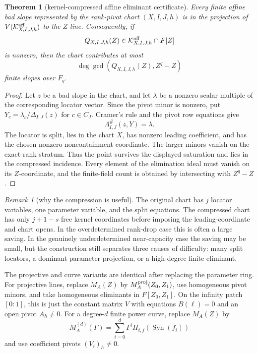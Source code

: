 \documentclass[11pt]{article}
\newtheorem{theorem}{Theorem}[section]
\theoremstyle{definition}
\theoremstyle{remark}
\newtheorem{remark}[remark]{Remark}
\newcommand{\Syn}{\operatorname{Syn}}
\begin{document}
\begin{theorem}[kernel-compressed affine eliminant certificate]
\label{thm:kernel-compressed-affine-eliminant}
Every finite affine bad slope represented by the rank-pivot chart
$(X,I,J,h)$ is in the projection of
$V(\mathcal K^{\rm aff}_{X,I,J,h})$ to the $Z$-line.  Consequently, if
\[
        Q_{X,I,J,h}(Z)\in
        \mathcal K^{\rm aff}_{X,I,J,h}\cap F[Z]
\]
is nonzero, then the chart contributes at most
\[
        \deg\gcd(Q_{X,I,J,h}(Z),Z^q-Z)
\]
finite slopes over $F_q$.
\end{theorem}

\begin{proof}
Let $z$ be a bad slope in the chart, and let $\lambda$ be a nonzero scalar
multiple of the corresponding locator vector.  Since the pivot minor is nonzero,
put $Y_c=\lambda_c/\Delta_{I,J}(z)$ for $c\in C_J$.  Cramer's rule and the pivot
row equations give
\[
        \Lambda^{\#}_{I,J}(z,Y)=\lambda .
\]
The locator is split, lies in the chart $X$, has nonzero leading coefficient,
and has the chosen nonzero noncontainment coordinate.  The larger minors vanish
on the exact-rank stratum.  Thus the point survives the displayed saturation and
lies in the compressed incidence.  Every element of the elimination ideal must
vanish on its $Z$-coordinate, and the finite-field count is obtained by
intersecting with $Z^q-Z$.
\end{proof}

\begin{remark}[why the compression is useful]
The original chart has $j$ locator variables, one parameter variable, and the
split equations.  The compressed chart has only $j+1-s$ free kernel coordinates
before imposing the leading-coordinate and chart opens.  In the overdetermined
rank-drop case this is often a large saving.  In the genuinely underdetermined
near-capacity case the saving may be small, but the construction still separates
three causes of difficulty: many split locators, a dominant parameter projection,
or a high-degree finite eliminant.
\end{remark}

The projective and curve variants are identical after replacing the parameter
ring.  For projective lines, replace $M_A(Z)$ by
$M_A^{\rm proj}(Z_0,Z_1)$, use homogeneous pivot minors, and take
homogeneous eliminants in $F[Z_0,Z_1]$.  On the infinity patch $[0:1]$, this is
just the constant matrix $V$ with equations $B(\ell)=0$ and an open pivot
$A_h\ne0$.  For a degree-$d$ finite power curve, replace $M_A(Z)$ by
\[
        M_A^{(d)}(\Gamma)=\sum_{i=0}^{d}\Gamma^i
        H_{t,j}(\Syn(f_i))
\]
and use coefficient pivots $(V_i)_h\ne0$.
\end{document}
